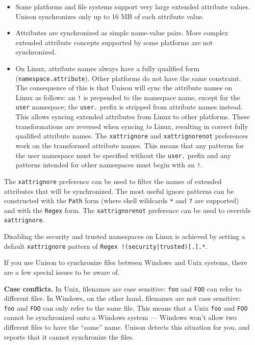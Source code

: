 \documentclass{article}
\begin{document}
\begin{itemize}
\item Some platforms and file systems support very large extended attribute
values. Unison synchronizes only up to 16 MB of each attribute value.
\item Attributes are synchronized as simple name-value pairs. More complex
extended attribute concepts supported by some platforms are not synchronized.
\item On Linux, attribute names always have a fully qualified form
(\texttt{namespace.attribute}). Other platforms do not have the same constraint.
The consequence of this is that Unison will sync the attribute names on Linux
as follows: an \verb|!| is prepended to the namespace name, except for the
\verb|user| namespace; the \verb|user.| prefix is stripped from attribute names
instead. This allows syncing extended attributes from Linux to other platforms.
These transformations are reversed when syncing {\em to} Linux, resulting in
correct fully qualified attribute names.
The \verb|xattrignore| and \verb|xattrignorenot| preferences work on the
transformed attribute names. This means that any patterns for the user
namespace must be specified without the \verb|user.| prefix and any patterns
intended for other namespaces must begin with an \verb|!|.
\end{itemize}

The \verb|xattrignore| preference can be used to filter the names of extended
attributes that will be synchronized. The most useful ignore patterns can
be constructed with the \verb|Path| form (where shell wildcards \verb|*| and
\verb|?| are supported) and with the \verb|Regex| form. The
\verb|xattrignorenot| preference can be used to override \verb|xattrignore|.

Disabling the security and trusted namespaces on Linux is achieved by setting
a default \verb|xattrignore| pattern of
\texttt{Regex !(security|trusted)[.].*}.



If you use Unison to synchronize files between Windows and Unix
systems, there are a few special issues to be aware of.

\textbf{Case conflicts.}  In Unix, filenames are case sensitive:
\texttt{foo} and \texttt{FOO} can refer to different files.  In
Windows, on the other hand, filenames are not case sensitive:
\texttt{foo} and \texttt{FOO} can only refer to the same file.  This
means that a Unix \texttt{foo} and \texttt{FOO} cannot be synchronized
onto a Windows system --- Windows won't allow two different files to
have the ``same'' name.  Unison detects this situation for you, and
reports that it cannot synchronize the files.
\end{document}

